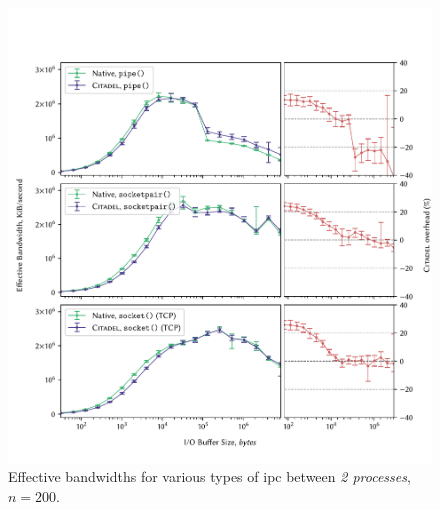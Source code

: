 \begin{figure}[]
    \centering
    \includegraphics[width=\linewidth]{figures/graphs/ipc-2proc.pdf}
    \vspace{-5mm}
    \caption[Effective bandwidths for various types of IPC between \textit{2 processes}.]{Effective bandwidths for various types of \acrshort{ipc} between \textit{2 processes}, $n=200$.}
    \label{fig:ipc-2proc-graph}
\end{figure}

\clearpage

